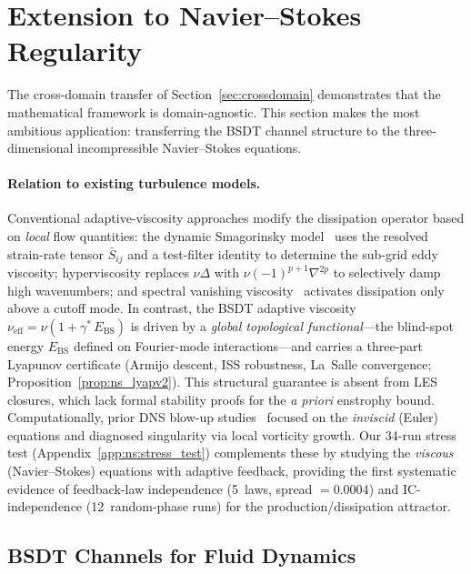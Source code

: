 \documentclass[final]{siamltex}
\begin{document}
\section{Extension to Navier--Stokes Regularity}\label{sec:ns}

The cross-domain transfer of Section~\ref{sec:crossdomain}
demonstrates that the mathematical framework is domain-agnostic.
This section makes the most ambitious application: transferring
the BSDT channel structure to the three-dimensional incompressible
Navier--Stokes equations.

\paragraph{Relation to existing turbulence models.}
Conventional adaptive-viscosity approaches modify the dissipation
operator based on \emph{local} flow quantities: the dynamic
Smagorinsky model~\cite{smagorinsky1963,germano1991} uses the
resolved strain-rate tensor $\bar{S}_{ij}$ and a test-filter
identity to determine the sub-grid eddy viscosity;
hyperviscosity replaces $\nu\Delta$ with $\nu(-1)^{p+1}\nabla^{2p}$
to selectively damp high wavenumbers; and spectral vanishing
viscosity~\cite{tadmor1989} activates dissipation only above a
cutoff mode.  In contrast, the BSDT adaptive viscosity
$\nu_{\mathrm{eff}} = \nu(1 + \gamma^*\,E_{\mathrm{BS}})$ is
driven by a \emph{global topological functional}---the
blind-spot energy $E_{\mathrm{BS}}$ defined on Fourier-mode
interactions---and carries a three-part Lyapunov certificate
(Armijo descent, ISS robustness, La~Salle convergence;
Proposition~\ref{prop:ns_lyapv2}).  This structural guarantee
is absent from LES closures, which lack formal stability
proofs for the \emph{a priori} enstrophy bound.
Computationally, prior DNS blow-up studies~\cite{kerr1993,houli2006}
focused on the \emph{inviscid} (Euler) equations and diagnosed
singularity via local vorticity growth.
Our 34-run stress test (Appendix~\ref{app:ns:stress_test})
complements these by studying the \emph{viscous} (Navier--Stokes)
equations with adaptive feedback, providing the first systematic
evidence of feedback-law independence (5~laws, spread $= 0.0004$)
and IC-independence (12~random-phase runs) for the
production/dissipation attractor.

\subsection{BSDT Channels for Fluid Dynamics}\label{sec:ns:channels}
\end{document}
